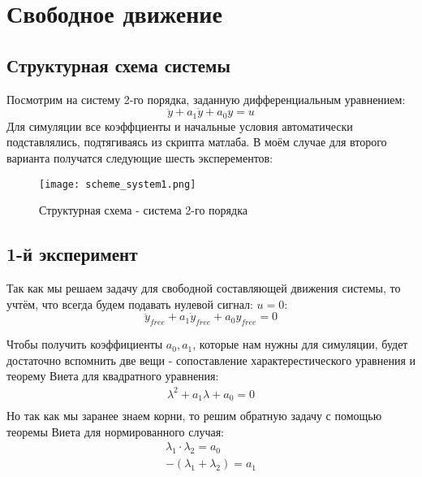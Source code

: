 \chapter{Свободное движение}
\label{ch:chap1}
\newcommand\tab[1][1cm]{\hspace*{#1}}



\lstset{style=mystyle}

\section{Структурная схема системы}

Посмотрим на  систему 2-го порядка, заданную дифференциальным уравнением:
$$
\ddot{y} + a_1\dot{y} + a_0y = u
$$
Для симуляции все коэффциенты и начальные условия автоматически подставлялись, подтягиваясь из скрипта матлаба. 
В моём случае для второго варианта получатся следующие шесть эксперементов:
\begin{figure}[ht]
    \centering
    \texttt{[image: scheme\_system1.png]}
	\caption{Структурная схема - система 2-го порядка}
\end{figure}
\newpage
\section{1-й эксперимент}
Так как мы решаем задачу для свободной составляющей движения системы, то учтём, что всегда будем подавать нулевой сигнал: $u = 0$:
$$
\ddot{y}_{free} + a_1\dot{y}_{free} + a_0y_{free} = 0
$$

Чтобы получить коэффициенты $a_0, a_1$, которые нам нужны для симуляции, будет достаточно вспомнить две вещи - сопоставление характерестического уравнения и теорему Виета для квадратного уравнения:
$$
\begin{aligned}
    \lambda^2 + a_1\lambda + a_0 = 0 \\
\end{aligned}
$$
Но так как мы заранее знаем корни, то решим обратную задачу с помощью теоремы Виета для нормированного случая:
$$
    \begin{aligned}
        \lambda_1 \cdot \lambda_2 = a_0 \\
        -(\lambda_1 + \lambda_2) = a_1 
    \end{aligned}
$$

